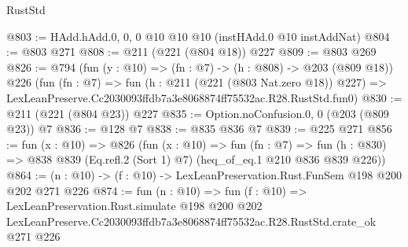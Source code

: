 \begin{lexlean}{RustStd}
\begin{coremodule}
@803 := HAdd.hAdd.{0, 0, 0} @10 @10 @10 (instHAdd.{0} @10 instAddNat)
@804 := @803 @271
@808 := @211 (@221 (@804 @18)) @227
@809 := @803 @269
@826 := @794
    (fun (y : @10) => (fn : @7) -> (h : @808) -> @203 (@809 @18))
    @226
    (fun (fn : @7) =>
    fun (h : @211 (@221 (@803 Nat.zero @18)) @227) =>
    LexLeanPreserve.Cc2030093ffdb7a3e8068874ff75532ac.R28.RustStd.fun0)
@830 := @211 (@221 (@804 @23)) @227
@835 := Option.noConfusion.{0, 0} (@203 (@809 @23)) @7
@836 := @128 @7
@838 := @835 @836 @7
@839 := @225 @271
@856 := fun (x : @10) =>
  @826
    (fun (x : @10) =>
    fun (fn : @7) =>
    fun (h : @830) => @838 @839 (Eq.refl.{2} (Sort 1) @7) (heq_of_eq.{1} @210 @836 @839 @226))
@864 := (n : @10) -> (f : @10) -> LexLeanPreservation.Rust.FunSem @198 @200 @202 @271 @226
@874 := fun (n : @10) =>
  fun (f : @10) =>
  LexLeanPreservation.Rust.simulate
    @198
    @200
    @202
    LexLeanPreserve.Cc2030093ffdb7a3e8068874ff75532ac.R28.RustStd.crate_ok
    @271
    @226
\end{coremodule}
\end{lexlean}
